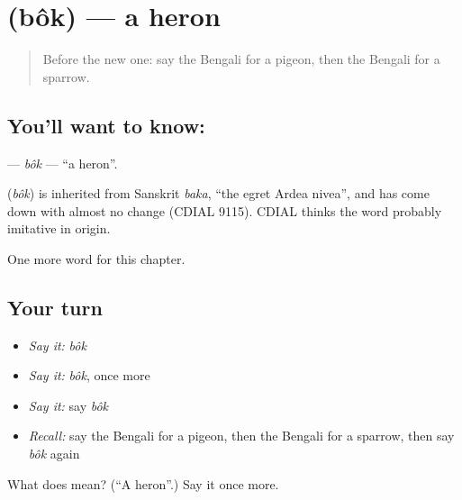 \section[\texorpdfstring{\bn{বক} (bôk)}{বক (bôk)}]{ (bôk) — a heron}

\label{lesson:BN-C121-bok}



\begin{quote}
Before the new one: say the Bengali for a pigeon, then the Bengali for a sparrow.
\end{quote}

\subsection*{You'll want to know: }
\textbf{} — \emph{bôk} — \textquotedblleft{}a heron\textquotedblright{}.

\begin{cousinweb}
\textbf{} (\emph{bôk}) is inherited from Sanskrit \emph{baka}, \textquotedblleft{}the egret Ardea nivea\textquotedblright{}, and has come down with almost no change (CDIAL 9115). CDIAL thinks the word probably imitative in origin.
\end{cousinweb}

\begin{grammarlens}[title={What you've built}]
One more word for this chapter.
\end{grammarlens}

\subsection*{Your turn}
\begin{itemize}
\raggedright
  \item \emph{Say it:} \emph{bôk}
  \item \emph{Say it:} \emph{bôk}, once more
  \item \emph{Say it:} say \emph{bôk}
  \item \emph{Recall:} say the Bengali for a pigeon, then the Bengali for a sparrow, then say \emph{bôk} again
\end{itemize}

\begin{tcolorbox}[breakable,colback=teal!4,colframe=teal!35!black,title={Before you move on}]
What does  mean? (\textquotedblleft{}A heron\textquotedblright{}.) Say it once more.
\end{tcolorbox}
